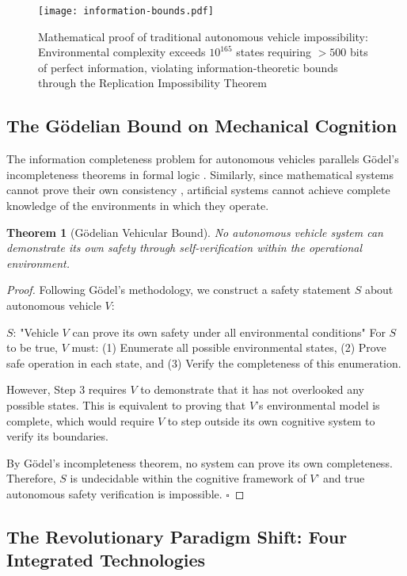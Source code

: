 \documentclass[12pt,a4paper]{article}
\newtheorem{theorem}{Theorem}[section]
\begin{document}
\begin{figure}[H]
\centering
\texttt{[image: information-bounds.pdf]}
\caption{Mathematical proof of traditional autonomous vehicle impossibility: Environmental complexity exceeds $10^{165}$ states requiring $>500$ bits of perfect information, violating information-theoretic bounds through the Replication Impossibility Theorem}
\label{fig:information-bounds}
\end{figure}

\subsection{The Gödelian Bound on Mechanical Cognition}

The information completeness problem for autonomous vehicles parallels Gödel's incompleteness theorems in formal logic \cite{godel1931,hofstadter1979}. Similarly, since mathematical systems cannot prove their own consistency \cite{godel1931}, artificial systems cannot achieve complete knowledge of the environments in which they operate.

\begin{theorem}[Gödelian Vehicular Bound]
No autonomous vehicle system can demonstrate its own safety through self-verification within the operational environment.
\end{theorem}

\begin{proof}
Following Gödel's methodology, we construct a safety statement $S$ about autonomous vehicle $V$:

$S$: "Vehicle $V$ can prove its own safety under all environmental conditions"
For $S$ to be true, $V$ must: (1) Enumerate all possible environmental states, (2) Prove safe operation in each state, and (3) Verify the completeness of this enumeration.

However, Step 3 requires $V$ to demonstrate that it has not overlooked any possible states. This is equivalent to proving that $V$'s environmental model is complete, which would require $V$ to step outside its own cognitive system to verify its boundaries.

By Gödel's incompleteness theorem, no system can prove its own completeness. Therefore, $S$ is undecidable within the cognitive framework of $V$' and true autonomous safety verification is impossible. $\square$
\end{proof}

\subsection{The Revolutionary Paradigm Shift: Four Integrated Technologies}
\end{document}
